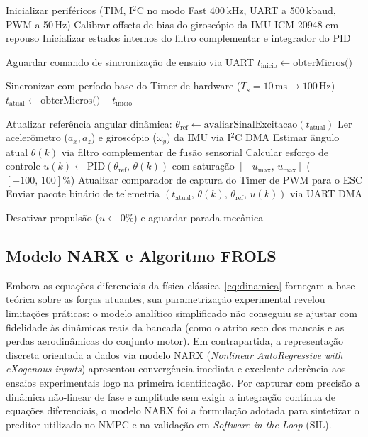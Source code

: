 \begin{algorithm}[H]
\caption{Ciclo Determinístico de Amostragem e Telemetria no STM32}
\label{alg:aquisicao_dados}
\begin{algorithmic}[1]
    \State Inicializar periféricos (TIM, I$^2$C no modo Fast 400\,kHz, UART a 500\,kbaud, PWM a 50\,Hz)
    \State Calibrar offsets de bias do giroscópio da IMU ICM-20948 em repouso
    \State Inicializar estados internos do filtro complementar e integrador do PID
\EndProcedure

\Statex
{}
    \State Aguardar comando de sincronização de ensaio via UART
    \State $t_{\text{inicio}} \gets \text{obterMicros()}$

        \State Sincronizar com período base do Timer de hardware ($T_s = 10\,\text{ms} \to 100\,\text{Hz}$)
        \State $t_{\text{atual}} \gets \text{obterMicros()} - t_{\text{inicio}}$

        \State Atualizar referência angular dinâmica: $\theta_{\text{ref}} \gets \text{avaliarSinalExcitacao}(t_{\text{atual}})$
        \State Ler acelerômetro ($a_x, a_z$) e giroscópio ($\omega_y$) da IMU via I$^2$C DMA
        \State Estimar ângulo atual $\theta(k)$ via filtro complementar de fusão sensorial
        \State Calcular esforço de controle $u(k) \gets \text{PID}(\theta_{\text{ref}},\, \theta(k))$ com saturação $[-u_{\max},\, u_{\max}]$ ($[-100,\, 100]\%$)
        \State Atualizar comparador de captura do Timer de PWM para o ESC
        \State Enviar pacote binário de telemetria $(t_{\text{atual}},\, \theta(k),\, \theta_{\text{ref}},\, u(k))$ via UART DMA
    \EndWhile

    \State Desativar propulsão ($u \gets 0\%$) e aguardar parada mecânica
\EndProcedure
\end{algorithmic}
\end{algorithm}

\subsection{Modelo NARX e Algoritmo FROLS}
\label{subsec:narx_frols}

Embora as equações diferenciais da física clássica~\eqref{eq:dinamica} forneçam a base teórica sobre as forças atuantes, sua parametrização experimental revelou limitações práticas: o modelo analítico simplificado não conseguiu se ajustar com fidelidade às dinâmicas reais da bancada (como o atrito seco dos mancais e as perdas aerodinâmicas do conjunto motor). Em contrapartida, a representação discreta orientada a dados via modelo NARX (\textit{Nonlinear AutoRegressive with eXogenous inputs}) apresentou convergência imediata e excelente aderência aos ensaios experimentais logo na primeira identificação. Por capturar com precisão a dinâmica não-linear de fase e amplitude sem exigir a integração contínua de equações diferenciais, o modelo NARX foi a formulação adotada para sintetizar o preditor utilizado no NMPC e na validação em \textit{Software-in-the-Loop} (SIL).


